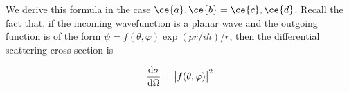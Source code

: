 \documentclass{article}
\begin{document}
We derive this formula in the case \(\ce{a}, \ce{b} = \ce{c}, \ce{d}\).
Recall the fact that, if the incoming wavefunction is a planar wave and the outgoing function is of the form \(\psi =  f(\theta, \varphi) \exp(pr/i \hbar) / r \), then the differential scattering cross section is

\begin{equation}
    \dv{\sigma}{\Omega} = \abs{f(\theta, \varphi)}^2
\end{equation}
\end{document}
